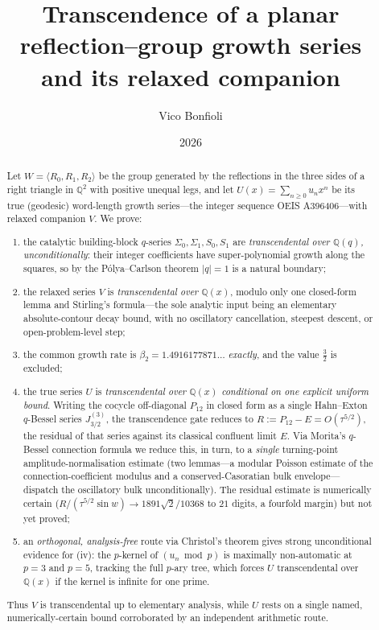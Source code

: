 \documentclass[11pt]{article}
\title{Transcendence of a planar reflection--group growth series\\ and its relaxed companion}
\author{Vico Bonfioli}
\date{2026}
\begin{document}
\maketitle

\begin{abstract}
\noindent Let $W=\langle R_0,R_1,R_2\rangle$ be the group generated by the reflections in the
three sides of a right triangle in $\mathbb Q^2$ with positive unequal legs, and let
$U(x)=\sum_{n\ge0}u_nx^n$ be its true (geodesic) word-length growth series---the integer
sequence \textup{OEIS A396406}---with relaxed companion $V$. We prove:
\begin{enumerate}[leftmargin=1.7em,itemsep=0.1em,topsep=0.2em]
\item[\textup{(i)}] the catalytic building-block $q$-series $\Sigma_0,\Sigma_1,S_0,S_1$ are
\emph{transcendental over $\mathbb Q(q)$, unconditionally}: their integer coefficients have
super-polynomial growth along the squares, so by the P\'olya--Carlson theorem $|q|=1$ is a
natural boundary;
\item[\textup{(ii)}] the relaxed series $V$ is \emph{transcendental over $\mathbb Q(x)$}, modulo
only one closed-form lemma and Stirling's formula---the sole analytic input being an elementary
absolute-contour decay bound, with no oscillatory cancellation, steepest descent, or
open-problem-level step;
\item[\textup{(iii)}] the common growth rate is $\beta_2=1.4916177871\ldots$ \emph{exactly}, and
the value $\tfrac32$ is excluded;
\item[\textup{(iv)}] the true series $U$ is \emph{transcendental over $\mathbb Q(x)$ conditional
on one explicit uniform bound}. Writing the cocycle off-diagonal $P_{12}$ in closed form as a
single Hahn--Exton $q$-Bessel series $J^{(3)}_{3/2}$, the transcendence gate reduces to
$R:=P_{12}-E=O(\tau^{5/2})$, the residual of that series against its classical confluent limit
$E$. Via Morita's $q$-Bessel connection formula we reduce this, in turn, to a \emph{single}
turning-point amplitude-normalisation estimate (two lemmas---a modular Poisson estimate of the
connection-coefficient modulus and a conserved-Casoratian bulk envelope---dispatch the
oscillatory bulk unconditionally). The residual estimate is numerically certain
($R/(\tau^{5/2}\sin w)\to1891\sqrt2/10368$ to $21$ digits, a fourfold margin) but not yet proved;
\item[\textup{(v)}] an \emph{orthogonal, analysis-free} route via Christol's theorem gives strong
unconditional evidence for (iv): the $p$-kernel of $(u_n\bmod p)$ is maximally non-automatic at
$p=3$ and $p=5$, tracking the full $p$-ary tree, which forces $U$ transcendental over
$\mathbb Q(x)$ if the kernel is infinite for one prime.
\end{enumerate}
Thus $V$ is transcendental up to elementary analysis, while $U$ rests on a single named,
numerically-certain bound corroborated by an independent arithmetic route.
\end{abstract}
\end{document}
